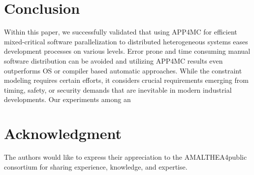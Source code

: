 \documentclass [a4paper,final,conference,10pt]{IDAACS}
\begin{document}
\section{Conclusion}
\label{sec:concl}
Within this paper, we successfully validated that using APP4MC for efficient mixed-critical software parallelization to distributed heterogeneous systems eases development processes on various levels. Error prone and time consuming manual software distribution can be avoided and utilizing APP4MC results even outperforms OS or compiler based automatic approaches. While the constraint modeling requires certain efforts, it considers crucial requirements emerging from timing, safety, or security demands that are inevitable in modern industrial developments. Our experiments among an 


\section*{Acknowledgment}
The authors would like to express their appreciation to the AMALTHEA4public consortium for sharing experience, knowledge, and expertise. %


\end{document}
